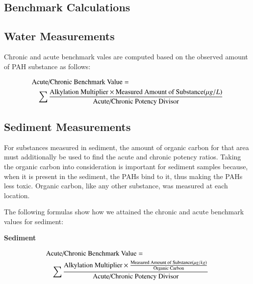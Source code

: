 \documentclass[authoryear,12pt]{elsarticle}
\begin{document}
\begin{appendix}
\section{Benchmark Calculations}\label{benchmarks}
\subsection{Water Measurements}
Chronic and acute benchmark vales are computed based on the observed amount of PAH substance as follows:

\begin{eqnarray*}
\lefteqn{\text{Acute/Chronic Benchmark Value} =} \\
&&\sum \frac{\text{Alkylation Multiplier} \times \text{Measured Amount of Substance} (\mu g/L)}{\text{Acute/Chronic Potency Divisor}}
\end{eqnarray*}

\subsection{Sediment Measurements}
For substances measured in sediment, the amount of organic carbon for that area must additionally be used to find the acute and chronic potency ratios. Taking the organic carbon into consideration is important for sediment samples because, when it is present in the sediment, the PAHs bind to it, thus making the PAHs less toxic. Organic carbon, like any other substance, was measured at each location.

The following formulas show how we attained the chronic and acute benchmark values for sediment:
\begin{center} \textbf{Sediment} \end{center}

\begin{eqnarray*}
\lefteqn{\text{Acute/Chronic Benchmark Value} =} \\
&& \sum \frac{\text{Alkylation Multiplier} \times \frac{\text{Measured Amount of Substance} (\mu g/kg)}{\text{Organic Carbon}}}{\text{Acute/Chronic Potency Divisor}}
\end{eqnarray*}

\end{appendix}


\end{document}
